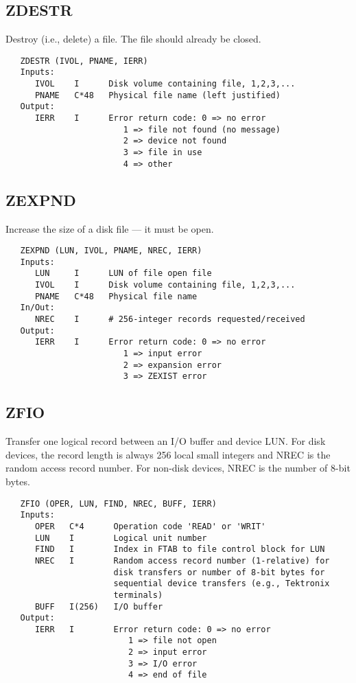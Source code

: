 \subsection{ZDESTR}
Destroy (i.e., delete) a file.  The file should already be closed.
\begin{verbatim}
   ZDESTR (IVOL, PNAME, IERR)
   Inputs:
      IVOL    I      Disk volume containing file, 1,2,3,...
      PNAME   C*48   Physical file name (left justified)
   Output:
      IERR    I      Error return code: 0 => no error
                        1 => file not found (no message)
                        2 => device not found
                        3 => file in use
                        4 => other
\end{verbatim}

\subsection{ZEXPND}
Increase the size of a disk file --- it must be open.
\begin{verbatim}
   ZEXPND (LUN, IVOL, PNAME, NREC, IERR)
   Inputs:
      LUN     I      LUN of file open file
      IVOL    I      Disk volume containing file, 1,2,3,...
      PNAME   C*48   Physical file name
   In/Out:
      NREC    I      # 256-integer records requested/received
   Output:
      IERR    I      Error return code: 0 => no error
                        1 => input error
                        2 => expansion error
                        3 => ZEXIST error
\end{verbatim}

\subsection{ZFIO}
Transfer one logical record between an I/O buffer and device LUN.
For disk devices, the record length is always 256 local small
integers and NREC is the random access record number.  For non-disk
devices, NREC is the number of 8-bit bytes.
\begin{verbatim}
   ZFIO (OPER, LUN, FIND, NREC, BUFF, IERR)
   Inputs:
      OPER   C*4      Operation code 'READ' or 'WRIT'
      LUN    I        Logical unit number
      FIND   I        Index in FTAB to file control block for LUN
      NREC   I        Random access record number (1-relative) for
                      disk transfers or number of 8-bit bytes for
                      sequential device transfers (e.g., Tektronix
                      terminals)
      BUFF   I(256)   I/O buffer
   Output:
      IERR   I        Error return code: 0 => no error
                         1 => file not open
                         2 => input error
                         3 => I/O error
                         4 => end of file
\end{verbatim}


